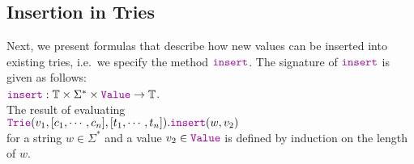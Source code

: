 \subsection{Insertion in Tries}
Next, we present formulas that describe how new values can be inserted into existing tries,
i.e.~we specify the method $\mytt{insert}$.  The signature of $\mytt{insert}$ is given as follows:
\\[0.2cm]
\hspace*{1.3cm}
$\mytt{insert}: \mathbb{T} \times \Sigma^* \times \mytt{Value} \rightarrow \mathbb{T}$.
\\[0.2cm]
The result of evaluating \\[0.2cm]
\hspace*{1.3cm} 
$\mytt{Trie}(v_1, [c_1, \cdots, c_n], [t_1, \cdots, t_n]).\mytt{insert}(w, v_2)$
\\[0.2cm]
for a string $w\in \Sigma^*$ and a value $v_2 \in \mytt{Value}$ is defined by induction on the
length of $w$.
